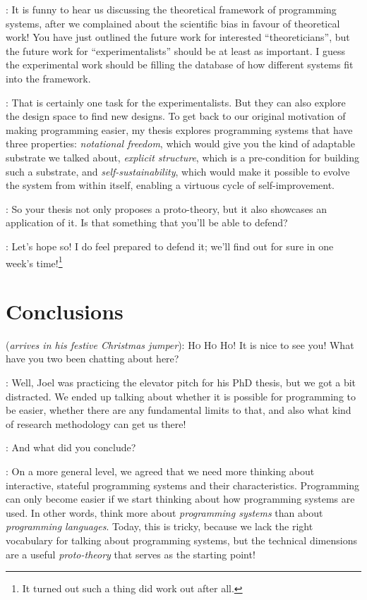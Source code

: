 \documentclass[runningheads]{llncs}
\newcommand{\T}{Tomas}
\newcommand{\J}{Joel}
\newcommand{\says}[2][gg]{\vspace{0.5em}\noindent\hangindent=0.5cm{\textsc{#1}}: #2}
\newcommand{\appears}[3][gg]{\vspace{0.5em}\noindent\hangindent=0.5cm{\textsc{#1}} (\emph{#2}): #3}
\begin{document}
\says[\T]{It is funny to hear us discussing the theoretical framework of programming systems, after we complained about the scientific bias in favour of theoretical work! You have just outlined the future work for interested ``theoreticians'', but the future work for ``experimentalists'' should be at least as important. I guess the experimental work should be filling the database of how different systems fit into the framework.}

\says[\J]{That is certainly one task for the experimentalists. But they can also explore the design space to find new designs. To get back to our original motivation of making programming easier, my thesis explores programming systems that have three properties: \emph{notational freedom}, which would give you the kind of adaptable substrate we talked about,
\emph{explicit structure}, which is a pre-condition for building such a substrate, and
\emph{self-sustainability}, which would make it possible to evolve the system from
within itself, enabling a virtuous cycle of self-improvement.}

\says[\T]{So your thesis not only proposes a proto-theory, but it also showcases an application of it. Is that something that you'll be able to defend?}

\says[\J]{Let's hope so! I do feel prepared to defend it; we'll find out for sure in one week's time!\footnote{It turned out such a thing did work out after all.}}

\section{Conclusions}

\appears[Alan]{arrives in his festive Christmas jumper}{\textsc{Ho Ho Ho!} It is nice to see you! What have you two been chatting about here?}

\says[\T]{Well, Joel was practicing the elevator pitch for his PhD thesis, but we got a bit distracted. We ended up talking about whether it is possible for programming to be easier, whether there are any fundamental limits to that, and also what kind of research methodology can get us there!}

\says[Alan]{And what did you conclude?}

\says[\J]{On a more general level, we agreed that we need more thinking about interactive, stateful programming systems and their characteristics. Programming can only become easier if we start thinking about how programming systems are used. In other words, think more about \emph{programming systems} than about \emph{programming languages}. Today, this is tricky, because we lack the right vocabulary for talking about programming systems, but the technical dimensions are a useful \emph{proto-theory} that serves as the starting point!}
\end{document}
